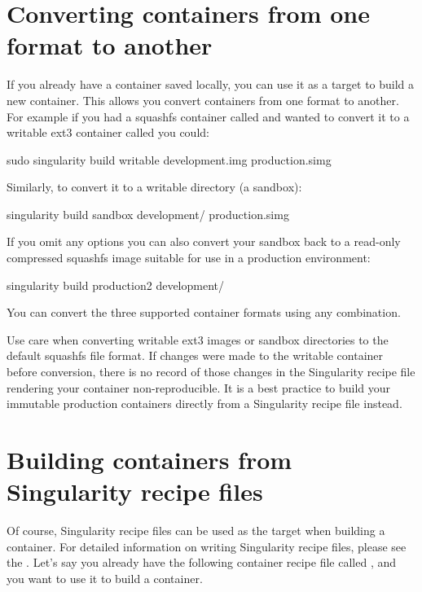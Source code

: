 \documentclass[letterpaper,10pt,english]{sphinxmanual}
\begin{document}
\section{Converting containers from one format to another}
\label{\detokenize{build_a_container:converting-containers-from-one-format-to-another}}
If you already have a container saved locally, you can use it as a
target to build a new container. This allows you convert containers from
one format to another. For example if you had a squashfs container
called  and wanted to convert it to a writable ext3 container called  you
could:

%
\begin{sphinxVerbatim}[commandchars=\\\{\}]
\PYGZdl{} sudo singularity build \PYGZhy{}\PYGZhy{}writable development.img production.simg
\end{sphinxVerbatim}

Similarly, to convert it to a writable directory (a sandbox):

%
\begin{sphinxVerbatim}[commandchars=\\\{\}]
\PYGZdl{} singularity build \PYGZhy{}\PYGZhy{}sandbox development/ production.simg
\end{sphinxVerbatim}

If you omit any options you can also convert your sandbox back to a
read-only compressed squashfs image suitable for use in a production
environment:

%
\begin{sphinxVerbatim}[commandchars=\\\{\}]
\PYGZdl{} singularity build production2 development/
\end{sphinxVerbatim}

You can convert the three supported container formats using any
combination.

Use care when converting writable ext3 images or sandbox directories
to the default squashfs file format. If changes were made to the
writable container before conversion, there is no record of those
changes in the Singularity recipe file rendering your container
non-reproducible. It is a best practice to build your immutable
production containers directly from a Singularity recipe file instead.


\section{Building containers from Singularity recipe files}
\label{\detokenize{build_a_container:building-containers-from-singularity-recipe-files}}
Of course, Singularity recipe files can be used as the target when
building a container. For detailed information on writing Singularity
recipe files, please see the {\hyperref[\detokenize{container_recipes:container-recipes}]{}}.
Let’s say you already have the following container recipe file called 
, and you want to use it to build a container.
\end{document}
